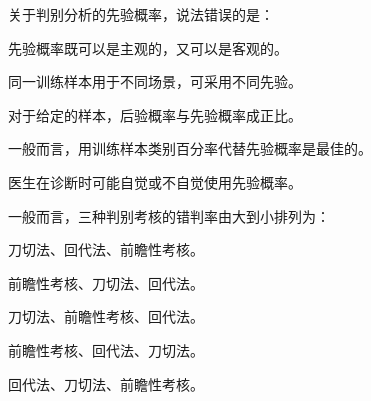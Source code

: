 \par\addvspace{6pt}\noindent\begin{minipage}{\linewidth}


关于判别分析的先验概率，说法错误的是：


\begin{choices}

\item 先验概率既可以是主观的，又可以是客观的。

\item 同一训练样本用于不同场景，可采用不同先验。

\item 对于给定的样本，后验概率与先验概率成正比。

\item 一般而言，用训练样本类别百分率代替先验概率是最佳的。

\item 医生在诊断时可能自觉或不自觉使用先验概率。

\end{choices}

\end{minipage}\par\vspace{4pt}

\par\addvspace{6pt}\noindent\begin{minipage}{\linewidth}


一般而言，三种判别考核的错判率由大到小排列为：


\begin{choices}

\item 刀切法、回代法、前瞻性考核。

\item 前瞻性考核、刀切法、回代法。

\item 刀切法、前瞻性考核、回代法。

\item 前瞻性考核、回代法、刀切法。

\item 回代法、刀切法、前瞻性考核。

\end{choices}

\end{minipage}\par\vspace{4pt}

